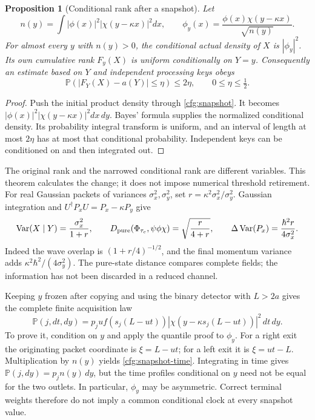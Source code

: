 \documentclass[11pt,oneside,openany]{book}
\newtheorem{proposition}[theorem]{Proposition}
\theoremstyle{definition}
\theoremstyle{remark}\newtheorem{remark}[theorem]{Remark}
\begin{document}
\begin{proposition}[Conditional rank after a snapshot]\label{cfg:rank}
Let
\[
 n(y)=\int|\phi(x)|^2|\chi(y-\kappa x)|^2dx,\qquad
 \phi_y(x)=\frac{\phi(x)\chi(y-\kappa x)}{\sqrt{n(y)}}.
\]
For almost every $y$ with $n(y)>0$, the conditional actual density of $X$
is $|\phi_y|^2$. Its own cumulative rank $F_y(X)$ is uniform conditionally
on $Y=y$. Consequently an estimate based on $Y$ and independent processing
keys obeys
\[
 \mathbb P(|F_Y(X)-a(Y)|\le\eta)\le2\eta,\qquad 0\le\eta\le\tfrac12.
\]
\end{proposition}
\begin{proof}
Push the initial product density through \eqref{cfg:snapshot}. It becomes
$|\phi(x)|^2|\chi(y-\kappa x)|^2dx\,dy$. Bayes' formula supplies the
normalized conditional density. Its probability integral transform is
uniform, and an interval of length at most $2\eta$ has at most that
conditional probability. Independent keys can be conditioned on and then
integrated out.
\end{proof}

The original rank and the narrowed conditional rank are different variables.
This theorem calculates the change; it does not impose numerical threshold
retirement. For real Gaussian packets of variances
$\sigma_x^2,\sigma_y^2$, set $r=\kappa^2\sigma_x^2/\sigma_y^2$.
Gaussian integration and $U^\dagger P_xU=P_x-\kappa P_y$ give
\[
 \operatorname{Var}(X\mid Y)=\frac{\sigma_x^2}{1+r},\qquad
 D_{\rm pure}(\Phi_{\tau_c},\psi\phi\chi)=\sqrt{\frac r{4+r}},
 \qquad
 \Delta\operatorname{Var}(P_x)=\frac{\hbar^2r}{4\sigma_x^2}.
\]
Indeed the wave overlap is $(1+r/4)^{-1/2}$, and the final momentum variance
adds $\kappa^2\hbar^2/(4\sigma_y^2)$.
The pure-state distance compares complete fields; the information has not
been discarded in a reduced channel.

Keeping $y$ frozen after copying and using the binary detector with $L>2a$
gives the complete finite acquisition law
\begin{equation}
 \mathbb P(j,dt,dy)=p_j u f(s_j(L-ut))
          |\chi(y-\kappa s_j(L-ut))|^2\,dt\,dy.
 \label{cfg:snapshot-time}
\end{equation}
To prove it, condition on $y$ and apply the quantile proof to $\phi_y$.
For a right exit the originating packet coordinate is $\xi=L-ut$; for a
left exit it is $\xi=ut-L$. Multiplication by $n(y)$ yields
\eqref{cfg:snapshot-time}. Integrating in time gives
$\mathbb P(j,dy)=p_j n(y)\,dy$, but the time profiles conditional on $y$
need not be equal for the two outlets. In particular, $\phi_y$ may be
asymmetric. Correct terminal weights therefore do not imply a common
conditional clock at every snapshot value.
\end{document}
